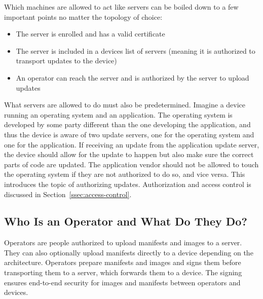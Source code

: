 \documentclass[0-thesis.tex]{subfiles}
\begin{document}
Which machines are allowed to act like servers can be boiled down to a few important
points no matter the topology of choice:

\begin{itemize}
    \item The server is enrolled and has a valid certificate
    \item The server is included in a devices list of servers (meaning it is authorized to
            transport updates to the device)
    \item An operator can reach the server and is authorized by the server to upload
            updates
\end{itemize}

What servers are allowed to do must also be predetermined. Imagine a device running an
operating system and an application. The operating system is developed by some party
different than the one developing the application, and thus the device is aware of two
update servers, one for the operating system and one for the application. If receiving an
update from the application update server, the device should allow for the update to
happen but also make sure the correct parts of code are updated. The application vendor
should not be allowed to touch the operating system if they are not authorized to do so,
and vice versa. This introduces the topic of authorizing updates. Authorization and access
control is discussed in Section~\ref{ssec:access-control}.

\subsection{Who Is an Operator and What Do They Do?}
\label{ssec:who-is-an-operator}
Operators are people authorized to upload manifests and images to a server. They can also
optionally upload manifests directly to a device depending on the architecture. Operators
prepare manifests and images and signs them before transporting them to a server, which
forwards them to a device. The signing ensures end-to-end security for images and
manifests between operators and devices.
\end{document}
